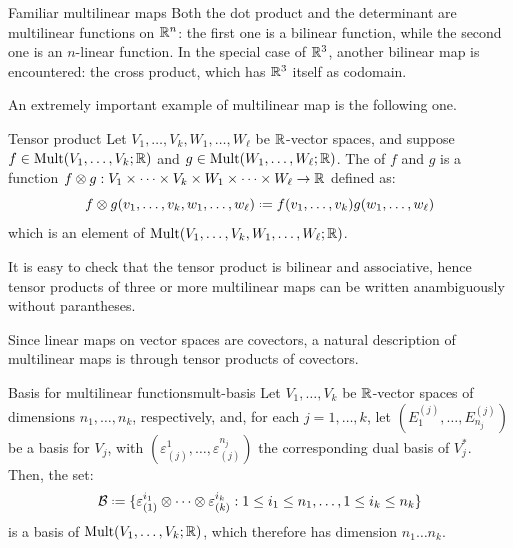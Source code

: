\begin{example}{Familiar multilinear maps}{}
  Both the dot product and the determinant are multilinear functions on $ \mathbb{R}^n $: the first one is a bilinear function, while the second one is an $ n $-linear function.
  In the special case of $ \mathbb{R}^3 $, another bilinear map is encountered: the cross product, which has $ \mathbb{R}^3 $ itself as codomain.
\end{example}

An extremely important example of multilinear map is the following one.

\begin{definition}{Tensor product}{}
  Let $ V_1 , \dots , V_k , W_1 , \dots , W_\ell $ be $ \mathbb{R} $-vector spaces, and suppose $ f \in \operatorname{Mult}(V_1 , \dots , V_k ; \mathbb{R}) $ and $ g \in \operatorname{Mult}(W_1 , \dots , W_\ell ; \mathbb{R}) $. The  of $ f $ and $ g $ is a function $ f \otimes g : V_1 \times \dots \times V_k \times W_1 \times \dots \times W_\ell \rightarrow \mathbb{R} $ defined as:
  \begin{equation}
    f \otimes g (v_1 , \dots , v_k , w_1 , \dots , w_\ell) \defeq f(v_1 , \dots , v_k) g(w_1 , \dots , w_\ell)
  \end{equation}
  which is an element of $ \operatorname{Mult}(V_1 , \dots , V_k , W_1 , \dots , W_\ell ; \mathbb{R}) $.
\end{definition}

It is easy to check that the tensor product is bilinear and associative, hence tensor products of three or more multilinear maps can be written anambiguously without parantheses.

Since linear maps on vector spaces are covectors, a natural description of multilinear maps is through tensor products of covectors.

\begin{proposition}{Basis for multilinear functions}{mult-basis}
  Let $ V_1 , \dots , V_k $ be $ \mathbb{R} $-vector spaces of dimensions $ n_1 , \dots , n_k $, respectively, and, for each $ j = 1 , \dots , k $, let $ (E_1^{(j)} , \dots , E_{n_j}^{(j)}) $ be a basis for $ V_j $, with $ (\varepsilon_{(j)}^1 , \dots , \varepsilon_{(j)}^{n_j}) $ the corresponding dual basis of $ V_j^* $. Then, the set:
  \begin{equation*}
    \bas \defeq \{ \varepsilon_{(1)}^{i_1} \otimes \dots \otimes \varepsilon_{(k)}^{i_k} : 1 \leq i_1 \leq n_1 , \dots , 1 \leq i_k \leq n_k \}
  \end{equation*}
  is a basis of $ \operatorname{Mult}(V_1 , \dots , V_k ; \mathbb{R}) $, which therefore has dimension $ n_1 \dots n_k $.
\end{proposition}

